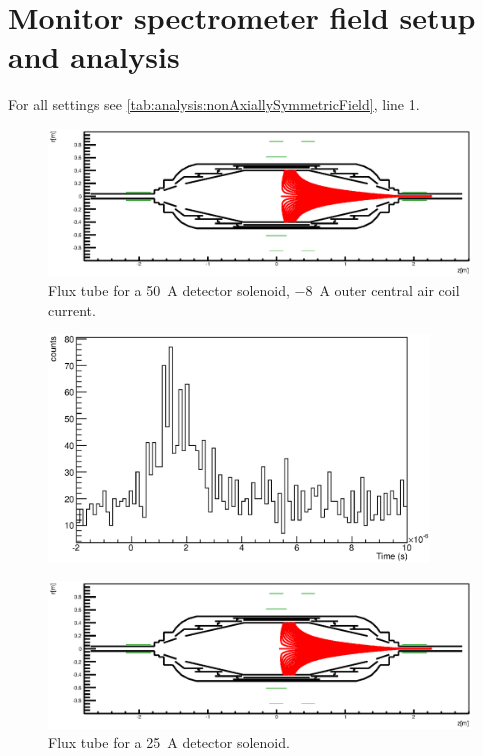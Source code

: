 \section{Monitor spectrometer field setup and analysis}
\label{ch:annex:sec:A3}
For all settings see \ref{tab:analysis:nonAxiallySymmetricField}, line 1.
\begin{figure}[h]
\centering

		\centerline{\includegraphics[width = 1.3\linewidth]{graphics/analysis/monSpec/fieldSimulation/AB.eps} }
	
	\caption[Asymmetric field \SI{50}{\ampere}]{Flux tube for a \SI{50}{\ampere} detector solenoid, \SI{-8}{\ampere} outer central air coil current.}
	\label{fig:ABf}
\end{figure}

\begin{figure}
\centering
	\includegraphics[width = 0.9\textwidth]{graphics/analysis/monSpec/AB.eps}
	\caption[\SI{50}{\ampere} loops]{}
	\label{fig:AB}
\end{figure}
\clearpage



\begin{figure}
\centering
			\centerline{\includegraphics[width = 1.3\linewidth]{graphics/analysis/monSpec/fieldSimulation/AA.eps}}
	
	\caption[\SI{25}{\ampere} asymmetric]{Flux tube for a \SI{25}{\ampere} detector solenoid.}
	\label{fig:AAf}
\end{figure}

